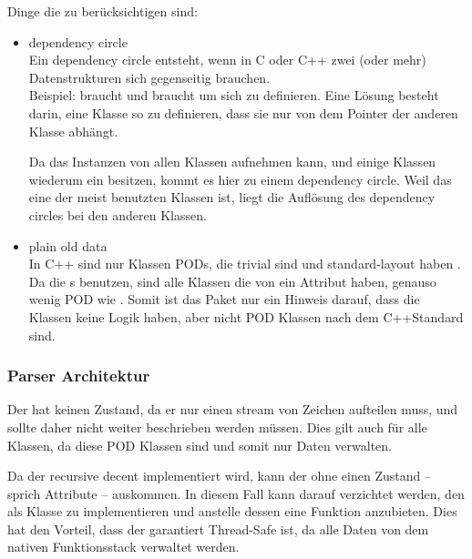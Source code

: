       Dinge die zu berücksichtigen sind:
      \begin{itemize}
        \item dependency circle\\
          Ein dependency circle entsteht, wenn in C oder C++ zwei (oder mehr) Datenstrukturen sich gegenseitig brauchen.\\
          Beispiel:  braucht  und  braucht  um sich zu definieren. Eine Lösung besteht darin, eine Klasse so zu definieren, dass sie nur von dem Pointer der anderen Klasse abhängt.

          Da das  Instanzen von allen  Klassen aufnehmen kann, und einige Klassen wiederum ein  besitzen, kommt es hier zu einem dependency circle. Weil das  eine der meist benutzten Klassen ist, liegt die Auflösung des dependency circles bei den anderen Klassen.
        \item plain old data\\
          In C++ sind nur Klassen PODs, die trivial sind und standard-layout haben \autocite[9 Classes §10]{C++14-std}. Da die s  benutzen, sind alle Klassen die von  ein Attribut haben, genauso wenig POD wie . Somit ist das  Paket nur ein Hinweis darauf, dass die Klassen keine Logik haben, aber nicht POD Klassen nach dem C++Standard sind.
      \end{itemize}

    \subsubsection{Parser Architektur}
    \label{sssec:Parser Architektur}
      Der  hat keinen Zustand, da er nur einen stream von Zeichen aufteilen muss, und sollte daher nicht weiter beschrieben werden müssen. Dies gilt auch für alle  Klassen, da diese POD Klassen sind und somit nur Daten verwalten.

      Da der  recursive decent implementiert wird, kann der  ohne einen Zustand -- sprich Attribute -- auskommen. In diesem Fall kann darauf verzichtet werden, den  als Klasse zu implementieren und anstelle dessen eine  Funktion anzubieten. Dies hat den Vorteil, dass der  garantiert Thread-Safe ist, da alle Daten von dem nativen Funktionsstack verwaltet werden.

